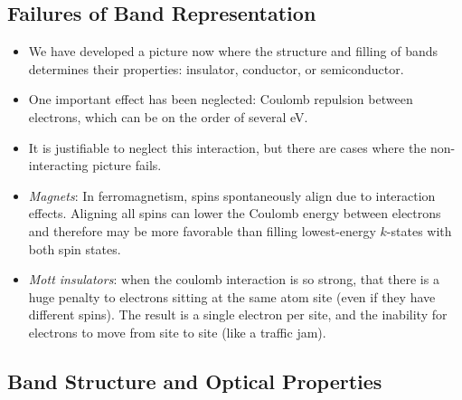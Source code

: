 \documentclass[10pt]{article}
\begin{document}
\subsection{Failures of Band Representation}
\begin{itemize}
  \item We have developed a picture now where the structure and filling of bands determines their properties: insulator, conductor, or semiconductor.
  \item One important effect has been neglected: Coulomb repulsion between electrons, which can be on the order of several eV.
  \item It is justifiable to neglect this interaction, but there are cases where the non-interacting picture fails.
  \item \emph{Magnets}: In ferromagnetism, spins spontaneously align due to interaction effects. Aligning all spins can lower the Coulomb energy between
  electrons and therefore may be more favorable than filling lowest-energy $k$-states with both spin states.
  \item \emph{Mott insulators}: when the coulomb interaction is so strong, that there is a huge penalty to electrons sitting at the same atom site (even
  if they have different spins). The result is a single electron per site, and the inability for electrons to move from site to site (like a traffic jam).
\end{itemize}

\subsection{Band Structure and Optical Properties}
\end{document}
